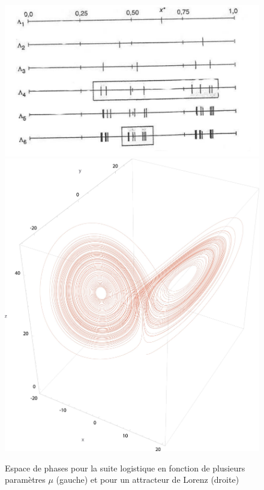 \documentclass[12pt,a4paper]{article}
\begin{document}
\begin{figure}
\begin{center}
\label{phases}
\includegraphics[scale=0.4]{medias/phase_logistique.png}
\includegraphics[scale=0.05]{medias/lorenz_attractor.jpg}
\caption{Espace de phases pour la suite logistique en fonction de plusieurs paramètres  $\mu$ (gauche) et pour un attracteur de Lorenz (droite)}
\end{center}
\end{figure}
\end{document}
